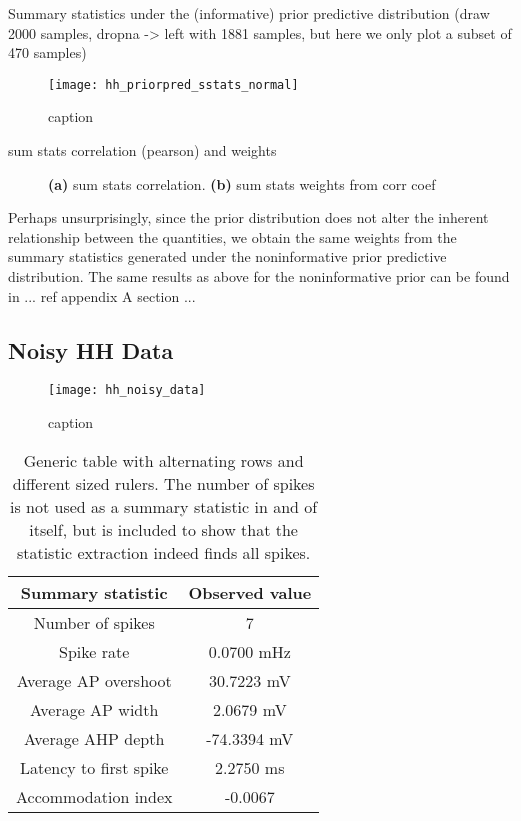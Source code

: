 Summary statistics under the (informative) prior predictive distribution (draw 2000 samples, dropna -> left with 1881 samples, but here we only plot a subset of 470 samples)

\begin{figure}[H]
    \centering
    \texttt{[image: hh\_priorpred\_sstats\_normal]}
    \caption{caption}
    \label{fig:fig1}
\end{figure} 


sum stats correlation (pearson) and weights

\begin{figure}[H]
\centering
{}
\qquad
{}
\caption{\textbf{(a)} sum stats correlation. \textbf{(b)} sum stats weights from corr coef
}
\label{fig:fig1}
\end{figure}


Perhaps unsurprisingly, since the prior distribution does not alter the inherent relationship between the quantities, we obtain the same weights from the summary statistics generated under the noninformative prior predictive distribution. The same results as above for the noninformative prior can be found in ... ref appendix A section ...

%


\subsection{Noisy HH Data}

\begin{figure}[H]
    \centering
    \texttt{[image: hh\_noisy\_data]}
    \caption{caption}
    \label{fig:fig1}
\end{figure} 


\begin{table}[H]
  \caption{Generic table with alternating rows and different sized rulers. The number of spikes is not used as a summary statistic in and of itself, but is included to show that the statistic extraction indeed finds all spikes.}
  \begin{center}
    \begin{tabular}{cc}
      \toprule
      \textbf{Summary statistic} & \textbf{Observed value} \\
      \midrule
      Number of spikes &  7 \\
      Spike rate &  0.0700 mHz \\
      Average AP overshoot & 30.7223 mV  \\
      Average AP width & 2.0679 mV \\
      Average AHP depth & -74.3394 mV \\
      Latency to first spike & 2.2750 ms \\
      Accommodation index &  -0.0067 \\
      \bottomrule
    \end{tabular}
  \end{center}
  \label{tab:hh_noisy_sumstats}
\end{table}




